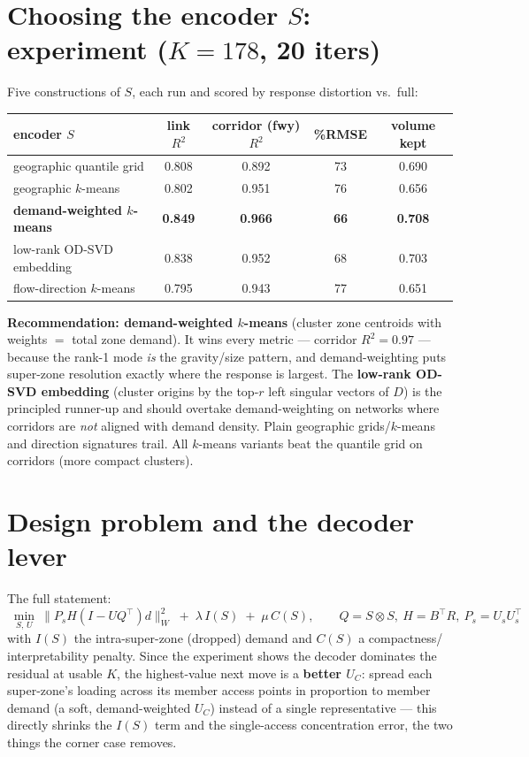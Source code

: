 \documentclass[11pt]{article}
\begin{document}
\section{Choosing the encoder $S$: experiment ($K{=}178$, 20 iters)}
Five constructions of $S$, each run and scored by response distortion vs.\ full:
\begin{center}\small
\begin{tabular}{lcccc}
\toprule
encoder $S$ & link $R^2$ & corridor (fwy) $R^2$ & \%RMSE & volume kept \\
\midrule
geographic quantile grid      & 0.808 & 0.892 & 73 & 0.690 \\
geographic $k$-means           & 0.802 & 0.951 & 76 & 0.656 \\
\textbf{demand-weighted $k$-means} & \textbf{0.849} & \textbf{0.966} & \textbf{66} & \textbf{0.708} \\
low-rank OD-SVD embedding      & 0.838 & 0.952 & 68 & 0.703 \\
flow-direction $k$-means       & 0.795 & 0.943 & 77 & 0.651 \\
\bottomrule
\end{tabular}
\end{center}
\noindent\textbf{Recommendation: demand-weighted $k$-means} (cluster zone centroids
with weights $=$ total zone demand). It wins every metric --- corridor $R^2=0.97$ ---
because the rank-1 mode \emph{is} the gravity/size pattern, and demand-weighting puts
super-zone resolution exactly where the response is largest. The
\textbf{low-rank OD-SVD embedding} (cluster origins by the top-$r$ left singular
vectors of $D$) is the principled runner-up and should overtake demand-weighting on
networks where corridors are \emph{not} aligned with demand density. Plain
geographic grids/$k$-means and direction signatures trail. All $k$-means variants
beat the quantile grid on corridors (more compact clusters).

\section{Design problem and the decoder lever}
The full statement:
\[
\boxed{\;\min_{S,\,U}\ \big\lVert P_sH(I-UQ^{\!\top})d\big\rVert_W^2
\;+\;\lambda\,I(S)\;+\;\mu\,C(S),
\qquad Q=S\otimes S,\ H=B^{\!\top}R,\ P_s=U_sU_s^{\!\top}\;}
\]
with $I(S)$ the intra-super-zone (dropped) demand and $C(S)$ a compactness/
interpretability penalty. Since the experiment shows the decoder dominates the
residual at usable $K$, the highest-value next move is a \textbf{better $U_C$}:
spread each super-zone's loading across its member access points in proportion to
member demand (a soft, demand-weighted $U_C$) instead of a single representative ---
this directly shrinks the $I(S)$ term and the single-access concentration error,
the two things the corner case removes.
\end{document}
